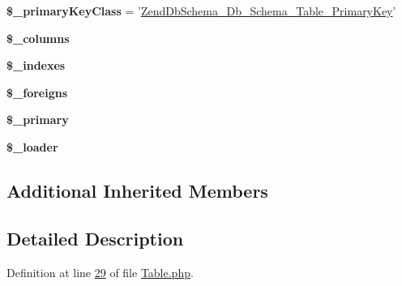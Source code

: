 \begin{DoxyCompactItemize}
\item 
\hypertarget{classZendDbSchema__Db__Schema__Table_aa3c638b13ac529a4e1f4edf21a6bf651}{{\bfseries \$\-\_\-primary\-Key\-Class} = '\hyperlink{classZendDbSchema__Db__Schema__Table__PrimaryKey}{Zend\-Db\-Schema\-\_\-\-Db\-\_\-\-Schema\-\_\-\-Table\-\_\-\-Primary\-Key}'}\label{classZendDbSchema__Db__Schema__Table_aa3c638b13ac529a4e1f4edf21a6bf651}

\item 
\hypertarget{classZendDbSchema__Db__Schema__Table_a6f850226043bc101a57b794b02d8f7b5}{{\bfseries \$\-\_\-columns}}\label{classZendDbSchema__Db__Schema__Table_a6f850226043bc101a57b794b02d8f7b5}

\item 
\hypertarget{classZendDbSchema__Db__Schema__Table_abb314751b3a9610a3668d109157de842}{{\bfseries \$\-\_\-indexes}}\label{classZendDbSchema__Db__Schema__Table_abb314751b3a9610a3668d109157de842}

\item 
\hypertarget{classZendDbSchema__Db__Schema__Table_a1d097539e46e842febf777c53dd3b2f9}{{\bfseries \$\-\_\-foreigns}}\label{classZendDbSchema__Db__Schema__Table_a1d097539e46e842febf777c53dd3b2f9}

\item 
\hypertarget{classZendDbSchema__Db__Schema__Table_a0a68762a70b1b761dfdaf3cb00157846}{{\bfseries \$\-\_\-primary}}\label{classZendDbSchema__Db__Schema__Table_a0a68762a70b1b761dfdaf3cb00157846}

\item 
\hypertarget{classZendDbSchema__Db__Schema__Table_aafbf564b424d4c208d6ca9a652fca909}{{\bfseries \$\-\_\-loader}}\label{classZendDbSchema__Db__Schema__Table_aafbf564b424d4c208d6ca9a652fca909}

\end{DoxyCompactItemize}
\subsection*{Additional Inherited Members}


\subsection{Detailed Description}


Definition at line \hyperlink{Table_8php_source_l00029}{29} of file \hyperlink{Table_8php_source}{Table.\-php}.



